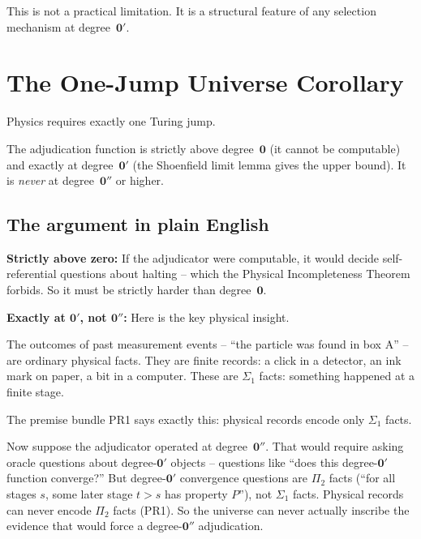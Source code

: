 \documentclass[11pt,a4paper]{article}
\newcommand{\zerp}{\mathbf{0}'}
\newcommand{\zer}{\mathbf{0}}
\newcommand{\zerpp}{\mathbf{0}''}
\begin{document}
This is not a practical limitation.  It is a structural feature of any
selection mechanism at degree~$\zerp$.

\section{The One-Jump Universe Corollary}
\label{sec:onejump}
\label{cor:onejump}

\begin{tcolorbox}[colback=boxgreen,colframe=green!50!black,
  title={The One-Jump Universe (P51, Corollary 6.5; CatAD under PR1--PR5)}]
Physics requires exactly one Turing jump.

\medskip
The adjudication function is strictly above degree~$\zer$ (it cannot be
computable) and exactly at degree~$\zerp$ (the Shoenfield limit lemma gives
the upper bound).  It is \emph{never} at degree~$\zerpp$ or higher.
\label{cor:onejump}
\end{tcolorbox}

\subsection{The argument in plain English}

\medskip\noindent\textbf{Strictly above zero:}  If the adjudicator were
computable, it would decide self-referential questions about halting -- which
the Physical Incompleteness Theorem forbids.  So it must be strictly harder
than degree~$\zer$.

\medskip\noindent\textbf{Exactly at $\zerp$, not $\zerpp$:}
Here is the key physical insight.

The outcomes of past measurement events -- ``the particle was found in box
A'' -- are ordinary physical facts.  They are finite records: a click in a
detector, an ink mark on paper, a bit in a computer.  These are $\Sigma_1$
facts: something happened at a finite stage.

The premise bundle PR1 says exactly this: physical records encode only
$\Sigma_1$ facts.

Now suppose the adjudicator operated at degree~$\zerpp$.  That would require
asking oracle questions about degree-$\zerp$ objects -- questions like
``does this degree-$\zerp$ function converge?''  But degree-$\zerp$ convergence
questions are $\Pi_2$ facts (``for all stages $s$, some later stage $t > s$
has property $P$''), not $\Sigma_1$ facts.  Physical records can never
encode $\Pi_2$ facts (PR1).  So the universe can never actually inscribe
the evidence that would force a degree-$\zerpp$ adjudication.
\end{document}
